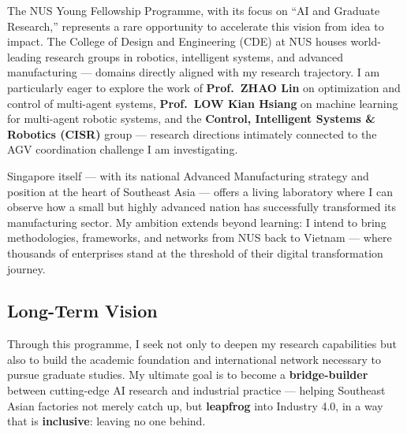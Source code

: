 \documentclass[
  12pt,
]{article}
\begin{document}
The NUS Young Fellowship Programme, with its focus on “AI and Graduate
Research,” represents a rare opportunity to accelerate this vision from
idea to impact. The College of Design and Engineering (CDE) at NUS
houses world-leading research groups in robotics, intelligent systems,
and advanced manufacturing — domains directly aligned with my research
trajectory. I am particularly eager to explore the work of
\textbf{Prof.~ZHAO Lin} on optimization and control of multi-agent
systems, \textbf{Prof.~LOW Kian Hsiang} on machine learning for
multi-agent robotic systems, and the \textbf{Control, Intelligent
Systems \& Robotics (CISR)} group — research directions intimately
connected to the AGV coordination challenge I am investigating.

Singapore itself — with its national Advanced Manufacturing strategy and
position at the heart of Southeast Asia — offers a living laboratory
where I can observe how a small but highly advanced nation has
successfully transformed its manufacturing sector. My ambition extends
beyond learning: I intend to bring methodologies, frameworks, and
networks from NUS back to Vietnam — where thousands of enterprises stand
at the threshold of their digital transformation journey.

\hypertarget{long-term-vision}{%
\subsection{Long-Term Vision}\label{long-term-vision}}

Through this programme, I seek not only to deepen my research
capabilities but also to build the academic foundation and international
network necessary to pursue graduate studies. My ultimate goal is to
become a \textbf{bridge-builder} between cutting-edge AI research and
industrial practice — helping Southeast Asian factories not merely catch
up, but \textbf{leapfrog} into Industry 4.0, in a way that is
\textbf{inclusive}: leaving no one behind.
\end{document}
